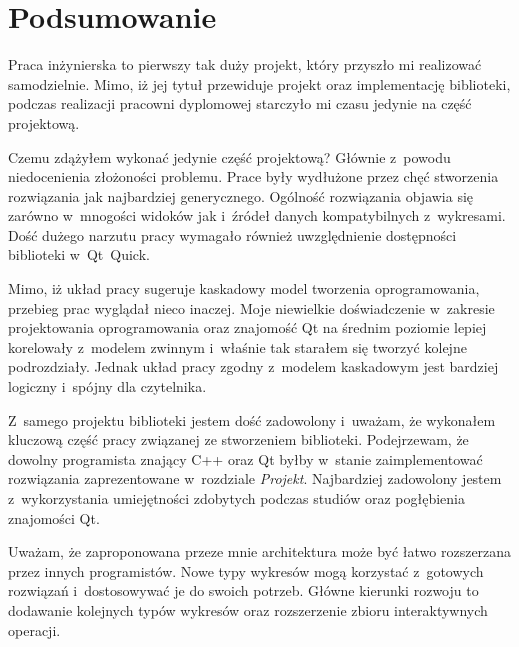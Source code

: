 \chapter{Podsumowanie}
Praca inżynierska to pierwszy tak duży projekt, który przyszło mi realizować samodzielnie. Mimo, iż jej tytuł przewiduje projekt oraz implementację biblioteki, podczas realizacji pracowni dyplomowej starczyło mi czasu jedynie na część projektową.

Czemu zdążyłem wykonać jedynie część projektową? Głównie z~powodu niedocenienia złożoności problemu. Prace były wydłużone przez chęć stworzenia rozwiązania jak najbardziej generycznego. Ogólność rozwiązania objawia się zarówno w~mnogości widoków jak i~źródeł danych kompatybilnych z~wykresami. Dość dużego narzutu pracy wymagało również uwzględnienie dostępności biblioteki w~Qt~Quick.

Mimo, iż układ pracy sugeruje kaskadowy model tworzenia oprogramowania, przebieg prac wyglądał nieco inaczej. Moje niewielkie doświadczenie w~zakresie projektowania oprogramowania oraz znajomość Qt na średnim poziomie lepiej korelowały z~modelem zwinnym i~właśnie tak starałem się tworzyć kolejne podrozdziały. Jednak układ pracy zgodny z~modelem kaskadowym jest bardziej logiczny i~spójny dla czytelnika.

Z~samego projektu biblioteki jestem dość zadowolony i~uważam, że wykonałem kluczową część pracy związanej ze stworzeniem biblioteki. Podejrzewam, że dowolny programista znający C++ oraz Qt byłby w~stanie zaimplementować rozwiązania zaprezentowane w~rozdziale \textit{Projekt}. Najbardziej zadowolony jestem z~wykorzystania umiejętności zdobytych podczas studiów oraz pogłębienia znajomości Qt.

Uważam, że zaproponowana przeze mnie architektura może być łatwo rozszerzana przez innych programistów. Nowe typy wykresów mogą korzystać z~gotowych rozwiązań i~dostosowywać je do swoich potrzeb. Główne kierunki rozwoju to dodawanie kolejnych typów wykresów oraz rozszerzenie zbioru interaktywnych operacji.


